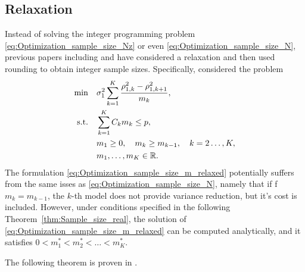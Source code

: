 \subsection{Relaxation}  \label{sec:MFMC_Nk_optimize_relax}
Instead of solving the integer programming problem \eqref{eq:Optimization_sample_size_Nz} or
even \eqref{eq:Optimization_sample_size_N}, previous papers including
\cite{BPeherstorfer_KWillcox_MDGunzburger_2016a} and \cite{AGruber_MGunzburger_LJu_ZWang_2023a}
have considered a relaxation  and then used rounding to obtain integer sample sizes.
Specifically, \cite{BPeherstorfer_KWillcox_MDGunzburger_2016a}
considered the problem
\begin{subequations}\label{eq:Optimization_sample_size_m_relaxed}
    \begin{align}
    \min \quad &\sigma_1^2  \sum_{k=1}^K \frac{ \rho_{1,k}^2 - \rho_{1,k+1}^2}{m_k},   \\
       \text{s.t.}\quad & \sum_{k=1}^K C_km_k \le p,       \\
                                & m_1\ge 0,\quad  m_k \ge m_{k-1}, \quad k=2\ldots,K,\\
                                &m_1,\ldots, m_K\in \mathbb{R}.
    \end{align}
\end{subequations}
The formulation \eqref{eq:Optimization_sample_size_m_relaxed} potentially suffers from the same isses as 
\eqref{eq:Optimization_sample_size_N}, namely that if f $m_k = m_{k-1}$, the $k$-th model does not
provide variance reduction, but it's cost is included. 
However, under conditions specified in the following Theorem~\ref{thm:Sample_size_real}, the solution
of \eqref{eq:Optimization_sample_size_m_relaxed} can be computed analytically, and it satisfies
$0  < m_1^* < m_2^* <  \ldots < m_K^*$.


The following theorem is proven in \cite[Th.~3.4]{BPeherstorfer_KWillcox_MDGunzburger_2016a}.

